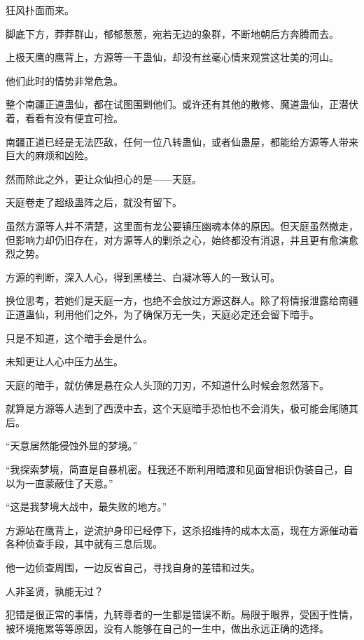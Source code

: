 
\begin{this_body}

狂风扑面而来。

脚底下方，莽莽群山，郁郁葱葱，宛若无边的象群，不断地朝后方奔腾而去。

上极天鹰的鹰背上，方源等一干蛊仙，却没有丝毫心情来观赏这壮美的河山。

他们此时的情势非常危急。

整个南疆正道蛊仙，都在试图围剿他们。或许还有其他的散修、魔道蛊仙，正潜伏着，看看有没有便宜可捡。

南疆正道已经是无法匹敌，任何一位八转蛊仙，或者仙蛊屋，都能给方源等人带来巨大的麻烦和凶险。

然而除此之外，更让众仙担心的是——天庭。

天庭卷走了超级蛊阵之后，就没有留下。

虽然方源等人并不清楚，这里面有龙公要镇压幽魂本体的原因。但天庭虽然撤走，但影响力却仍旧存在，对方源等人的剿杀之心，始终都没有消退，并且更有愈演愈烈之势。

方源的判断，深入人心，得到黑楼兰、白凝冰等人的一致认可。

换位思考，若她们是天庭一方，也绝不会放过方源这群人。除了将情报泄露给南疆正道蛊仙，利用他们之外，为了确保万无一失，天庭必定还会留下暗手。

只是不知道，这个暗手会是什么。

未知更让人心中压力丛生。

天庭的暗手，就仿佛是悬在众人头顶的刀刃，不知道什么时候会忽然落下。

就算是方源等人逃到了西漠中去，这个天庭暗手恐怕也不会消失，极可能会尾随其后。

“天意居然能侵蚀外显的梦境。”

“我探索梦境，简直是自暴机密。枉我还不断利用暗渡和见面曾相识伪装自己，自以为一直蒙蔽住了天意。”

“这是我梦境大战中，最失败的地方。”

方源站在鹰背上，逆流护身印已经停下，这杀招维持的成本太高，现在方源催动着各种侦查手段，其中就有三息后现。

他一边侦查周围，一边反省自己，寻找自身的差错和过失。

人非圣贤，孰能无过？

犯错是很正常的事情，九转尊者的一生都是错误不断。局限于眼界，受困于性情，被环境拖累等等原因，没有人能够在自己的一生中，做出永远正确的选择。


\end{this_body}
